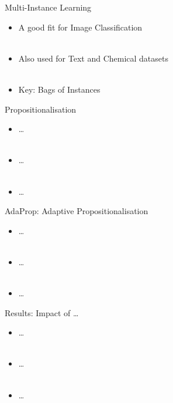 \documentclass{beamer}
\begin{document}
\begin{frame}{Multi-Instance Learning}

    \begin{itemize}
        \item A good fit for Image Classification \\ ~
        \item Also used for Text and Chemical datasets \\ ~
        \item Key: Bags of Instances
    \end{itemize}
\end{frame}

\begin{frame}{Propositionalisation}

    \begin{itemize}
        \item \dots \\ ~
        \item \dots \\ ~
        \item \dots
    \end{itemize}
\end{frame}

\begin{frame}{AdaProp: Adaptive Propositionalisation}

    \begin{itemize}
        \item \dots \\ ~
        \item \dots \\ ~
        \item \dots
    \end{itemize}
\end{frame}

\begin{frame}{Results: Impact of \dots}

    \begin{itemize}
        \item \dots \\ ~
        \item \dots \\ ~
        \item \dots
    \end{itemize}
\end{frame}
\end{document}
